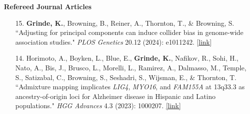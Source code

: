 \documentclass[margin]{res}
\begin{document}
\begin{resume}
\textbf{Refereed Journal Articles}

\begin{itemize}
\item[15.] \textbf{Grinde, K.}, Browning, B., Reiner, A., Thornton, T., \& Browning, S. ``Adjusting for principal components can induce collider bias in genome-wide association studies." \textit{PLOS Genetics} 20.12 (2024):  e1011242. \href{https://doi.org/10.1371/journal.pgen.1011242}{[link]}

\item[14.] Horimoto, A., Boyken, L., Blue, E., \textbf{Grinde, K.}, Nafikov, R., Sohi, H., Nato, A., Bis, J., Brusco, L., Morelli, L., Ramirez, A., Dalmasso, M.,  Temple, S., Satizabal, C., Browning, S., Seshadri, S., Wijsman, E., \& Thornton, T. ``Admixture mapping implicates \textit{LIG4}, \textit{MYO16}, and \textit{FAM155A} at 13q33.3 as ancestry-of-origin loci for Alzheimer disease in Hispanic and Latino populations." \textit{HGG Advances} 4.3 (2023): 1000207.  
\href{https://www.cell.com/hgg-advances/pdf/S2666-2477(23)00039-8.pdf}{[link]}


\end{itemize}
\end{resume}
\end{document}
